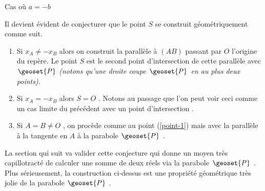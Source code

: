 \begin{center}
	\footnotesize
	\itshape

	
	\smallskip
	Cas où $a = -b$
\end{center}


\medskip

Il devient évident de conjecturer que le point $S$ se construit géométriquement comme suit.

\begin{enumerate}
	\item \label{point-1} Si $x_A \neq - x_B$ alors on construit la parallèle à $(AB)$ passant par $O$ l'origine du repère. Le point $S$ est le second point d'intersection de cette parallèle avec $\geoset{P}$  \emph{(notons qu'une droite coupe $\geoset{P}$ en au plus deux points)}.

	\item Si $x_A = - x_B$ alors $S = O$ . Notons au passage que l'on peut voir ceci comme un cas limite du précédent avec un point d'intersection .

	\item Si $A = B \neq O$ , on procède comme au point (\ref{point-1}) mais avec la parallèle à la tangente en $A$ à la parabole $\geoset{P}$ .
\end{enumerate}


La section qui suit va valider cette conjecture qui donne un moyen très capillotracté de calculer une somme de deux réels via la parabole $\geoset{P}$ .
Plus sérieusement, la construction ci-dessus est une propriété géométrique très jolie de la parabole $\geoset{P}$ .
